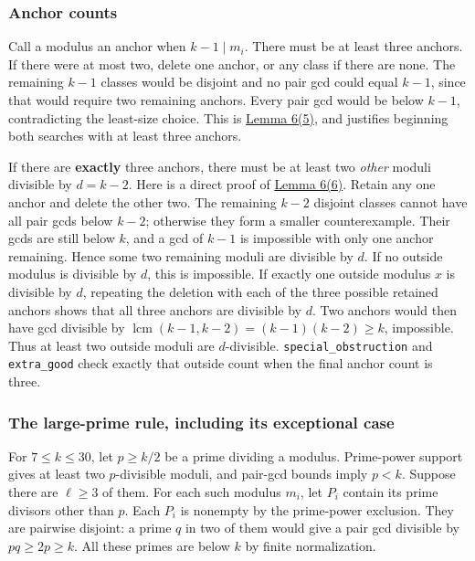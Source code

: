 \documentclass[11pt,a4paper]{article}
\begin{document}
\subsubsection{Anchor counts}\label{anchor-counts}

Call a modulus an anchor when \(k-1\mid m_i\). There must be at least three anchors. If there were at most two, delete one anchor, or any class if there are none. The remaining \(k-1\) classes would be disjoint and no pair gcd could equal \(k-1\), since that would require two remaining anchors. Every pair gcd would be below \(k-1\), contradicting the least-size choice. This is \href{https://arxiv.org/pdf/math/0604347v2}{Lemma 6(5)}, and justifies beginning both searches with at least three anchors.

If there are \textbf{exactly} three anchors, there must be at least two \emph{other} moduli divisible by \(d=k-2\). Here is a direct proof of \href{https://arxiv.org/pdf/math/0604347v2}{Lemma 6(6)}. Retain any one anchor and delete the other two. The remaining \(k-2\) disjoint classes cannot have all pair gcds below \(k-2\); otherwise they form a smaller counterexample. Their gcds are still below \(k\), and a gcd of \(k-1\) is impossible with only one anchor remaining. Hence some two remaining moduli are divisible by \(d\). If no outside modulus is divisible by \(d\), this is impossible. If exactly one outside modulus \(x\) is divisible by \(d\), repeating the deletion with each of the three possible retained anchors shows that all three anchors are divisible by \(d\). Two anchors would then have gcd divisible by \(\operatorname{lcm}(k-1,k-2)=(k-1)(k-2)\ge k\), impossible. Thus at least two outside moduli are \(d\)-divisible. \texttt{special\_obstruction} and \texttt{extra\_good} check exactly that outside count when the final anchor count is three.

\subsubsection{The large-prime rule, including its exceptional case}\label{the-large-prime-rule-including-its-exceptional-case}

For \(7\le k\le30\), let \(p\ge k/2\) be a prime dividing a modulus. Prime-power support gives at least two \(p\)-divisible moduli, and pair-gcd bounds imply \(p<k\). Suppose there are \(\ell\ge3\) of them. For each such modulus \(m_i\), let \(P_i\) contain its prime divisors other than \(p\). Each \(P_i\) is nonempty by the prime-power exclusion. They are pairwise disjoint: a prime \(q\) in two of them would give a pair gcd divisible by \(pq\ge2p\ge k\). All these primes are below \(k\) by finite normalization.
\end{document}
